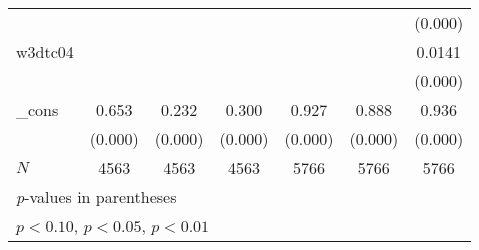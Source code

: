 {\begin{tabular}{l*{6}{c}}
            &                     &                     &                     &                     &                     &     (0.000)         \\
[1em]
w3dtc04     &                     &                     &                     &                     &                     &      0.0141\sym{***}\\
            &                     &                     &                     &                     &                     &     (0.000)         \\
[1em]
\_cons      &       0.653\sym{***}&       0.232\sym{***}&       0.300\sym{***}&       0.927\sym{***}&       0.888\sym{***}&       0.936\sym{***}\\
            &     (0.000)         &     (0.000)         &     (0.000)         &     (0.000)         &     (0.000)         &     (0.000)         \\
\hline
\(N\)       &        4563         &        4563         &        4563         &        5766         &        5766         &        5766         \\
\hline\hline
\multicolumn{7}{l}{\footnotesize \textit{p}-values in parentheses}\\
\multicolumn{7}{l}{\footnotesize \sym{*} \(p<0.10\), \sym{**} \(p<0.05\), \sym{***} \(p<0.01\)}\\
\end{tabular}
}
